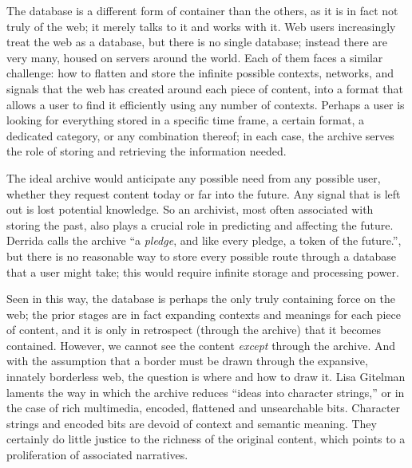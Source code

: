 The database is a different form of container than the others, as it is in fact not truly of the web; it merely talks to it and works with it. Web users increasingly treat the web as a database, but there is no single database; instead there are very many, housed on servers around the world. Each of them faces a similar challenge: how to flatten and store the infinite possible contexts, networks, and signals that the web has created around each piece of content, into a format that allows a user to find it efficiently using any number of contexts. Perhaps a user is looking for everything stored in a specific time frame, a certain format, a dedicated category, or any combination thereof; in each case, the archive serves the role of storing and retrieving the information needed.

The ideal archive would anticipate any possible need from any possible user, whether they request content today or far into the future. Any signal that is left out is lost potential knowledge. So an archivist, most often associated with storing the past, also plays a crucial role in predicting and affecting the future. Derrida calls the archive ``a \emph{pledge}, and like every pledge, a token of the future.''\autocite[18]{derrida_archive_1995}, but there is no reasonable way to store every possible route through a database that a user might take; this would require infinite storage and processing power.

Seen in this way, the database is perhaps the only truly containing force on the web; the prior stages are in fact expanding contexts and meanings for each piece of content, and it is only in retrospect (through the archive) that it becomes contained. However, we cannot see the content \emph{except} through the archive. And with the assumption that a border must be drawn through the expansive, innately borderless web, the question is where and how to draw it. Lisa Gitelman laments the way in which the archive reduces ``ideas into character strings,'' or in the case of rich multimedia, encoded, flattened and unsearchable bits.\autocite{gitelman_response_2013} Character strings and encoded bits are devoid of context and semantic meaning. They certainly do little justice to the richness of the original content, which points to a proliferation of associated narratives.

